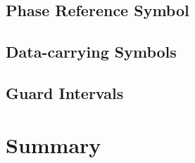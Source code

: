 \documentclass[class=report,11pt,crop=false]{standalone}
\begin{document}
\subsection{Phase Reference Symbol}


\subsection{Data-carrying Symbols}


\subsection{Guard Intervals}



\section{Summary}


\ifstandalone

\printnoidxglossary[type=\acronymtype,nonumberlist]
\fi
\end{document}
